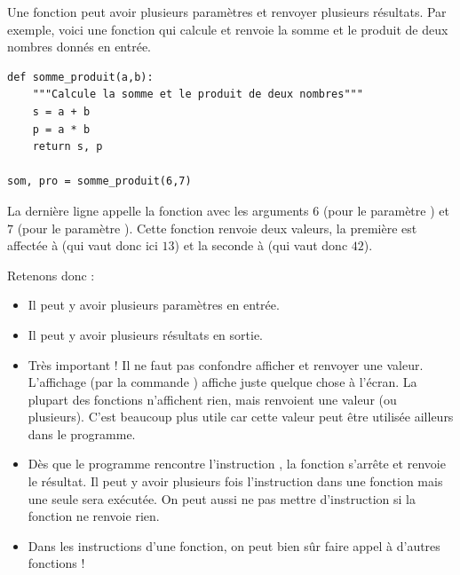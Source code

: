 \documentclass[11pt,class=report,crop=false]{standalone}
\begin{document}
\begin{cours}

Une fonction peut avoir plusieurs paramètres et renvoyer plusieurs résultats.
Par exemple, voici une fonction qui calcule et renvoie la somme et le produit de deux nombres donnés en entrée.

\begin{center}
\begin{lstlisting}
def somme_produit(a,b):
    """Calcule la somme et le produit de deux nombres"""
    s = a + b
    p = a * b
    return s, p
    
som, pro = somme_produit(6,7)
\end{lstlisting}
\end{center}

La dernière ligne appelle la fonction avec les arguments $6$ (pour le paramètre ) et $7$ (pour le paramètre ). Cette fonction renvoie deux valeurs, la première est affectée à  (qui vaut donc ici $13$) et la seconde à  (qui vaut donc $42$).


Retenons donc :
\begin{itemize}
  \item Il peut y avoir plusieurs paramètres en entrée.
  
  \item Il peut y avoir plusieurs résultats en sortie.
  
  \item Très important ! Il ne faut pas confondre afficher et renvoyer une valeur.
  L'affichage (par la commande ) affiche juste quelque chose à l'écran. La plupart des fonctions n'affichent rien, mais renvoient une valeur (ou plusieurs). C'est beaucoup plus utile car cette valeur peut être utilisée ailleurs dans le programme.
  
  \item Dès que le programme rencontre l'instruction , la fonction s'arrête et renvoie le résultat. Il peut y avoir plusieurs fois l'instruction  dans une fonction mais une seule sera exécutée. On peut aussi ne pas mettre d'instruction  si la fonction ne renvoie rien.
  
  \item Dans les instructions d'une fonction, on peut bien sûr faire appel à d'autres fonctions !
   

\end{itemize}
\end{cours}
\end{document}
